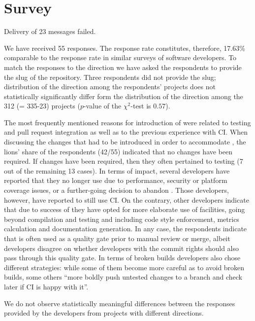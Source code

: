 \section{Survey}
\label{sec:survey}

Delivery of 23 messages failed.

We have received 55 responses.  
The response rate constitutes, therefore, 17.63\% comparable to the response rate in similar surveys of \GH software developers.
To match the responses to the direction  we have asked the respondents to provide the slug of the \GH repository.
Three respondents did not provide the slug; distribution of the direction among the respondents' projects does not statistically significantly differ form the distribution of the direction among the 312 (= 335-23) projects ($p$-value of the $\chi^2$-test is $0.57$).


The most frequently mentioned reasons for introduction of \Tvis were related to testing and pull request integration as well as to the previous experience with CI.
When discussing the changes that had to be introduced in order to accommodate \Tvis, the lions' share of the respondents (42/55)  indicated that no changes have been required. If changes have been required, then they often pertained to testing (7 out of the remaining 13 cases).
In terms of impact, several developers have reported that they no longer use \Tvis due to performance, security or platform coverage issues, or a further-going decision to abandon \GH. 
Those developers, however, have reported to still use CI.
On the contrary, other developers indicate that due to success of \Tvis they have opted for more elaborate use of \Tvis facilities, going beyond compilation and testing and including code style enforcement, metrics calculation and documentation generation.  
In any case, the respondents indicate that \Tvis is often used as a quality gate prior to manual review or merge, albeit developers disagree on whether developers with the commit rights should also pass through this quality gate.
In terms of broken builds developers also chose different strategies: while some of them become more careful as to avoid broken builds, some others ``more boldly push untested changes to a branch and check later if CI is happy with it''.

We do not observe statistically meaningful differences between the responses provided by the developers from projects with different directions.